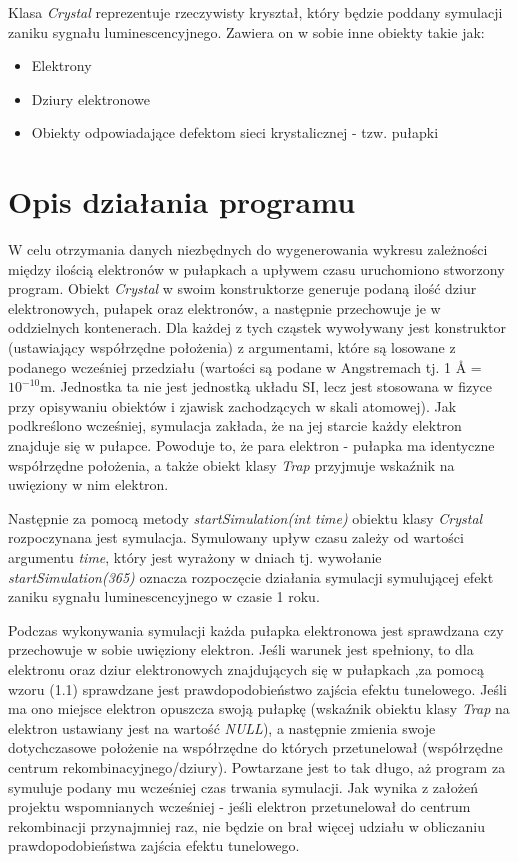 Klasa \textit{Crystal} reprezentuje rzeczywisty kryształ, który będzie poddany symulacji zaniku sygnału luminescencyjnego. Zawiera on w sobie inne obiekty takie jak:

\begin{itemize}
\item Elektrony
\item Dziury elektronowe
\item Obiekty odpowiadające defektom sieci krystalicznej - tzw. pułapki
\end{itemize}

\section{Opis działania programu}



W celu otrzymania danych niezbędnych do wygenerowania wykresu zależności między ilością elektronów w pułapkach a upływem czasu uruchomiono stworzony program. Obiekt \textit{Crystal} w swoim konstruktorze generuje podaną ilość dziur elektronowych, pułapek oraz elektronów, a następnie przechowuje je w oddzielnych kontenerach. Dla każdej z tych cząstek wywoływany jest konstruktor (ustawiający współrzędne położenia) z argumentami, które są losowane z podanego wcześniej przedziału (wartości są podane w Angstremach tj. 1 Å = $10^{-10}$m. Jednostka ta nie jest jednostką układu SI, lecz jest stosowana w fizyce przy opisywaniu obiektów i zjawisk zachodzących w skali atomowej). Jak podkreślono wcześniej, symulacja zakłada, że na jej starcie każdy elektron znajduje się w pułapce. Powoduje to, że para elektron - pułapka ma identyczne współrzędne położenia, a także obiekt klasy \textit{Trap} przyjmuje wskaźnik na uwięziony w nim elektron.

Następnie za pomocą metody \textit{startSimulation(int time)} obiektu klasy \textit{Crystal} rozpoczynana jest symulacja. Symulowany upływ czasu  zależy od wartości argumentu \textit{time}, który jest wyrażony w dniach tj. wywołanie \emph{startSimulation(365)} oznacza rozpoczęcie działania symulacji symulującej efekt zaniku sygnału luminescencyjnego w czasie 1 roku.

Podczas wykonywania symulacji każda pułapka elektronowa jest sprawdzana czy przechowuje w sobie uwięziony elektron. Jeśli warunek jest spełniony, to dla elektronu oraz dziur elektronowych znajdujących się w pułapkach ,za pomocą wzoru (1.1) sprawdzane jest prawdopodobieństwo zajścia efektu tunelowego. Jeśli ma ono miejsce elektron opuszcza swoją pułapkę (wskaźnik obiektu klasy \textit{Trap} na elektron ustawiany jest na wartość \textit{NULL}), a następnie zmienia swoje dotychczasowe położenie na współrzędne do których przetunelował (współrzędne centrum rekombinacyjnego/dziury). Powtarzane jest to tak długo, aż program za symuluje podany mu wcześniej czas trwania symulacji.  Jak wynika z założeń projektu wspomnianych wcześniej - jeśli elektron przetunelował do centrum rekombinacji przynajmniej raz, nie będzie on brał więcej udziału w obliczaniu prawdopodobieństwa zajścia efektu tunelowego. 

